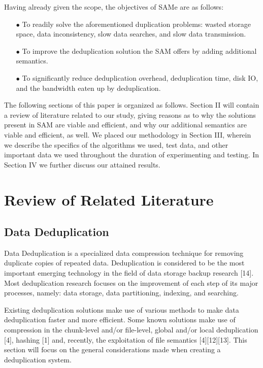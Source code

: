 \documentclass[journal]{IEEEtran}
\begin{document}
Having already given the scope, the objectives of SAMe are as follows:
\begin{enumerate}
\item[$\bullet$]To readily solve the aforementioned duplication problems: wasted storage space, data inconsistency, slow data searches, and slow data transmission.
\item[$\bullet$]To improve the deduplication solution the SAM offers by adding additional semantics.
\item[$\bullet$]To significantly reduce deduplication overhead, deduplication time, disk IO, and the bandwidth eaten up by deduplication.
\end{enumerate}

The following sections of this paper is organized as follows. Section II will contain a review of literature related to our study, giving reasons as to why the solutions present in SAM are viable and efficient, and why our additional semantics are viable and efficient, as well. We placed our methodology in Section III, wherein we describe the specifics of the algorithms we used, test data, and other important data we used throughout the duration of experimenting and testing. In Section IV we further discuss our attained results.

\section{Review of Related Literature}

\subsection{Data Deduplication}

Data Deduplication is a specialized data compression technique for removing duplicate copies of repeated data. Deduplication is considered to be the most important emerging technology in the field of data storage backup research [14]. Most deduplication research focuses on the improvement of each step of its major processes, namely: data storage, data partitioning, indexing, and searching.

Existing deduplication solutions make use of various methods to make data deduplication faster and more efficient. Some known solutions make use of compression in the chunk-level and/or file-level, global and/or local deduplication [4], hashing [1] and, recently, the exploitation of file semantics [4][12][13]. This section will focus on the general considerations made when creating a deduplication system.
\end{document}
